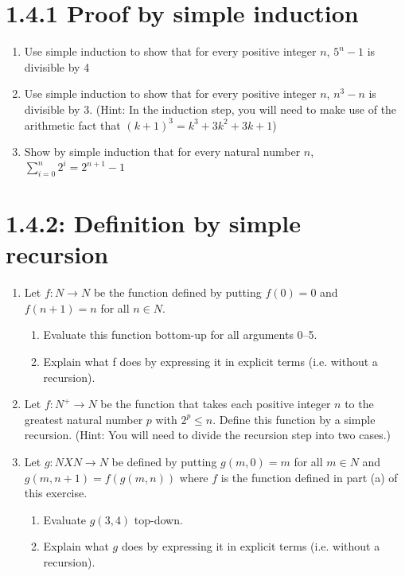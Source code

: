 \documentclass{article}
\begin{document}
\section*{1.4.1 Proof by simple induction}
\begin{enumerate}
    \item Use simple induction to show that for every positive integer $n$, $5^n - 1$ is divisible by 4
    \item Use simple induction to show that for every positive integer $n$, $n^3- n$ is divisible by 3. (Hint: In the induction step, you will need to make use of the arithmetic fact that $(k+1)^3 = k^3 + 3k^2 + 3k +1$)
    \item Show by simple induction that for every natural number $n$, $\sum_{i=0}^{n} 2^{i} = 2^{n+1} - 1$
\end{enumerate}
\section*{1.4.2: Definition by simple recursion}
\begin{enumerate}
    \item  Let $f: N \rightarrow N$ be the function defined by putting $f (0) = 0$ and $f(n+1) = n$ for all $n \in N$.
    \begin{enumerate}
        \item Evaluate this function bottom-up for all arguments 0–5.
        \item Explain what f does by expressing it in explicit terms (i.e. without a recursion).
    \end{enumerate}
    \item Let $f : N^{+} \rightarrow N$ be the function that takes each positive integer $n$ to the greatest natural number $p$ with $2^{p} \leq n$. Define this function by a simple recursion. (Hint: You will need to divide the recursion step into two cases.)
    \item Let $g: NXN \rightarrow N$ be defined by putting $g(m,0)= m$ for all $m \in N$ and $g(m,n+1)=f (g(m,n))$ where $f$ is the function defined in part (a) of this exercise.
    \begin{enumerate}
        \item Evaluate $g(3,4)$ top-down.
        \item Explain what $g$ does by expressing it in explicit terms (i.e. without a recursion).
    \end{enumerate}
\end{enumerate}
\end{document}
